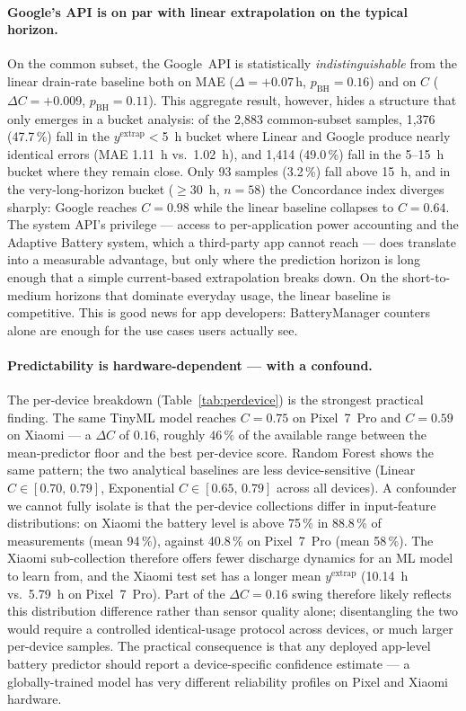 \documentclass[conference]{IEEEtran}
\begin{document}
\paragraph{Google's API is on par with linear extrapolation on the typical horizon.}
On the common subset, the Google~API is statistically
\emph{indistinguishable} from the linear drain-rate baseline both on
MAE ($\Delta{=}{+}0.07\,$h, $p_{\text{BH}}{=}0.16$) and on $C$
($\Delta C{=}{+}0.009$, $p_{\text{BH}}{=}0.11$). This aggregate
result, however, hides a structure that only emerges in a bucket
analysis: of the 2{,}883 common-subset samples, 1{,}376 (47.7\,\%)
fall in the $y^{\text{extrap}} < $\SI{5}{\hour} bucket where Linear
and Google produce nearly identical errors (MAE \SI{1.11}{\hour}
vs.\ \SI{1.02}{\hour}), and 1{,}414 (49.0\,\%) fall in the
5--\SI{15}{\hour} bucket where they remain close. Only 93 samples
(3.2\,\%) fall above \SI{15}{\hour}, and in the very-long-horizon
bucket ($\geq$\SI{30}{\hour}, $n{=}58$) the Concordance index
diverges sharply: Google reaches $C{=}0.98$ while the linear
baseline collapses to $C{=}0.64$. The system API's privilege --- access to
per-application power accounting and the Adaptive Battery system,
which a third-party app cannot reach --- does translate into a
measurable advantage, but only where the prediction horizon is long
enough that a simple current-based extrapolation breaks down. On the
short-to-medium horizons that dominate everyday usage, the
linear baseline is competitive. This is good news for app
developers: BatteryManager counters alone are enough for the use
cases users actually see.

\paragraph{Predictability is hardware-dependent --- with a confound.}
The per-device breakdown (Table~\ref{tab:perdevice}) is the strongest
practical finding. The same TinyML model reaches $C{=}0.75$ on
Pixel~7~Pro and $C{=}0.59$ on Xiaomi --- a $\Delta C$ of $0.16$,
roughly $46\,\%$ of the available range between the mean-predictor
floor and the best per-device score. Random Forest shows the same
pattern; the two analytical baselines are less device-sensitive
(Linear $C \in [0.70,\,0.79]$, Exponential $C \in [0.65,\,0.79]$
across all devices).
A confounder we cannot fully isolate is that the per-device
collections differ in input-feature distributions: on Xiaomi the
battery level is above 75\,\% in 88.8\,\% of measurements
(mean 94\,\%), against 40.8\,\% on Pixel~7~Pro (mean 58\,\%). The
Xiaomi sub-collection therefore offers fewer discharge dynamics for
an ML model to learn from, and the Xiaomi test set has a longer mean
$y^{\text{extrap}}$ (\SI{10.14}{\hour} vs.\ \SI{5.79}{\hour} on
Pixel~7~Pro). Part of the $\Delta C{=}0.16$ swing therefore likely
reflects this distribution difference rather than sensor quality
alone; disentangling the two would require a controlled identical-usage
protocol across devices, or much larger per-device samples.
The practical consequence is that any deployed app-level battery
predictor should report a device-specific confidence estimate ---
a globally-trained model has very different reliability profiles on
Pixel and Xiaomi hardware.
\end{document}
